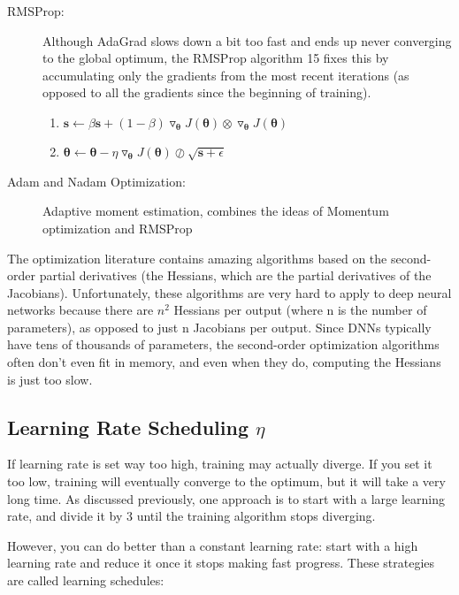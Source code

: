 \documentclass[french]{article}
\begin{document}
\begin{description}
    \item[RMSProp: ] Although AdaGrad slows down a bit too fast and ends up never converging to the global optimum, the RMSProp algorithm 15 fixes this by accumulating only the gradients from the most recent iterations (as opposed to all the gradients since the beginning of training).
        \begin{enumerate}
            \item $\bm{s} \leftarrow \beta \bm{s} + (1 - \beta) \triangledown_{\bm{\theta}} J(\bm{\theta}) \otimes \triangledown_{\bm{\theta}} J(\bm{\theta})$
            \item $\bm{\theta} \leftarrow \bm{\theta} - \eta \triangledown_{\bm{\theta}} J(\bm{\theta}) \oslash \sqrt{\bm{s} + \epsilon}$
        \end{enumerate}
    \item[Adam and Nadam Optimization: ] Adaptive moment estimation, combines the ideas of Momentum optimization and RMSProp
\end{description}

The optimization literature contains amazing algorithms based on the second-order partial derivatives (the Hessians, which are the partial derivatives of the Jacobians). Unfortunately, these algorithms are very hard to apply to deep neural networks because there are $n^2$ Hessians per output (where n is the
number of parameters), as opposed to just n Jacobians per output. Since DNNs typically have tens of thousands of parameters, the second-order optimization algorithms often don’t even fit in memory, and even when they do, computing the Hessians is just too slow.

\subsection{Learning Rate Scheduling $\eta$}

If learning rate is set way too high, training may actually diverge. If you set it too low, training will eventually converge to the optimum, but it will take a very long time. As discussed previously, one approach is to start with a large learning rate, and divide it by 3 until the training algorithm stops diverging.

However, you can do better than a constant learning rate: start with a high learning rate and reduce it once it stops making fast progress. These strategies are called learning schedules:
\end{document}

